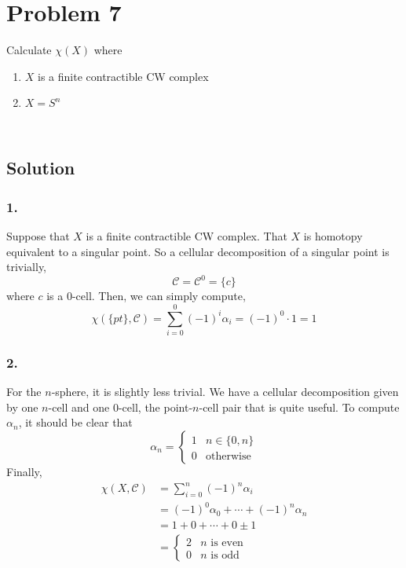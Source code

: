 \documentclass{article}
\theoremstyle{definition}
\begin{document}
\section*{Problem 7}
Calculate $\chi(X)$ where
\begin{enumerate}
\item $X$ is a finite contractible CW complex
\item $X = S^n$
\end{enumerate}
\\ \hline
    \subsection*{Solution}
    \subsubsection*{1.}
    Suppose that $X$ is a finite contractible CW complex.
    That $X$ is homotopy equivalent to a singular point.
    So a cellular decomposition of a singular point is trivially,
    \[
    \mathcal{C} = \mathcal{C}^0 = \{c\}
    \] 
    where $c$ is a 0-cell.
    Then, we can simply compute,
    \[
    \chi(\{pt\},\mathcal{C}) = \sum_{i=0}^{0} (-1)^i \alpha_i = (-1)^0 \cdot 1 = 1
    \] 
    \subsubsection*{2.}
    For the $n$-sphere, it is slightly less trivial.
    We have a cellular decomposition given by one $n$-cell and one 0-cell,
    the point-$n$-cell pair that is quite useful.
    To compute $\alpha_n$, it should be clear that 
    \[
    \alpha_n = \begin{cases}
        1 & n\in\{0,n\}\\
        0 & \text{otherwise}
    \end{cases}
    \] 
    Finally,
    \begin{align*}
        \chi(X,\mathcal{C}) &= \sum_{i=0}^n (-1)^n \alpha_i \\
                            &= (-1)^0 \alpha_0 + \cdots + (-1)^n \alpha_n \\
                            &= 1 + 0 + \cdots + 0 \pm 1 \\
                            &= \begin{cases}
            2 & n \text{ is even }\\
            0 & n \text{ is odd}
        \end{cases} 
    \end{align*}
\end{document}
